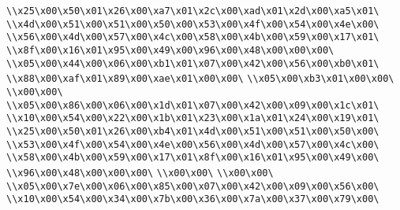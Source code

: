 \verb|\\x25\x00\x50\x01\x26\x00\xa7\x01\x2c\x00\xad\x01\x2d\x00\xa5\x01\|\newline
\verb|\\x4d\x00\x51\x00\x51\x00\x50\x00\x53\x00\x4f\x00\x54\x00\x4e\x00\|\newline
\verb|\\x56\x00\x4d\x00\x57\x00\x4c\x00\x58\x00\x4b\x00\x59\x00\x17\x01\|\newline
\verb|\\x8f\x00\x16\x01\x95\x00\x49\x00\x96\x00\x48\x00\x00\x00\|\newline
\verb|\\x05\x00\x44\x00\x06\x00\xb1\x01\x07\x00\x42\x00\x56\x00\xb0\x01\|\newline
\verb|\\x88\x00\xaf\x01\x89\x00\xae\x01\x00\x00\|\newline
\verb|\\x05\x00\xb3\x01\x00\x00\|\newline
\verb|\\x00\x00\|\newline
\verb|\\x05\x00\x86\x00\x06\x00\x1d\x01\x07\x00\x42\x00\x09\x00\x1c\x01\|\newline
\verb|\\x10\x00\x54\x00\x22\x00\x1b\x01\x23\x00\x1a\x01\x24\x00\x19\x01\|\newline
\verb|\\x25\x00\x50\x01\x26\x00\xb4\x01\x4d\x00\x51\x00\x51\x00\x50\x00\|\newline
\verb|\\x53\x00\x4f\x00\x54\x00\x4e\x00\x56\x00\x4d\x00\x57\x00\x4c\x00\|\newline
\verb|\\x58\x00\x4b\x00\x59\x00\x17\x01\x8f\x00\x16\x01\x95\x00\x49\x00\|\newline
\verb|\\x96\x00\x48\x00\x00\x00\|\newline
\verb|\\x00\x00\|\newline
\verb|\\x00\x00\|\newline
\verb|\\x05\x00\x7e\x00\x06\x00\x85\x00\x07\x00\x42\x00\x09\x00\x56\x00\|\newline
\verb|\\x10\x00\x54\x00\x34\x00\x7b\x00\x36\x00\x7a\x00\x37\x00\x79\x00\|\newline
